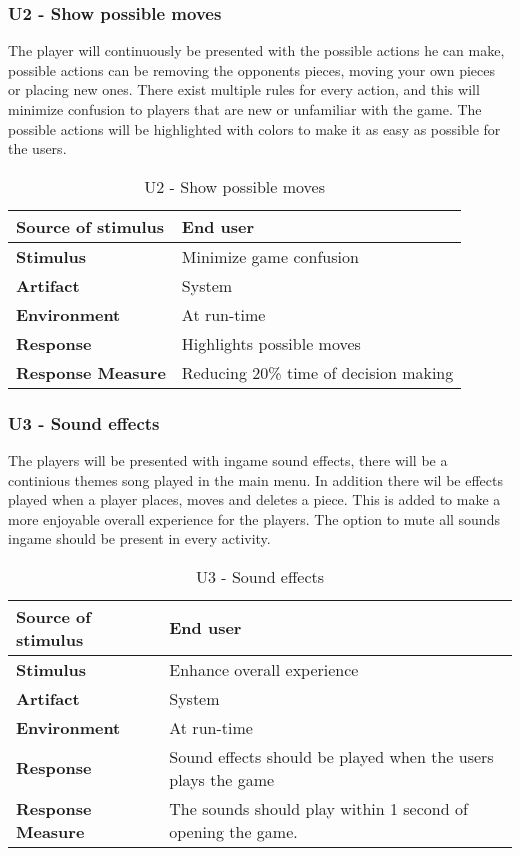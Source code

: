 \pagebreak

\subsubsection{U2 - Show possible moves}

The player will continuously be presented with the possible actions he can make, possible actions can be removing the opponents pieces, moving your own pieces or placing new ones. There exist multiple rules for every action, and this will minimize confusion to players that are new or unfamiliar with the game. The possible actions will be highlighted with colors to make it as easy as possible for the users.

\begin{table}[h!]
\begin{tabular}{ | p{110pt} | p{250pt}  |}
\hline
\bf Source of stimulus &  End user  \\ \hline
\bf Stimulus & Minimize game confusion \\ \hline 
\bf Artifact & System  \\  \hline
\bf Environment & At run-time \\ \hline
\bf Response & Highlights possible moves \\ \hline
\bf Response Measure & Reducing 20\% time of decision making   \\ \hline
\end{tabular}
\caption{U2 - Show possible moves}
\end{table}

\subsubsection{U3 - Sound effects}

The players will be presented with ingame sound effects, there will be a continious themes song played in the main menu. In addition there wil be effects played when a player places, moves and deletes a piece. This is added to make a more enjoyable overall experience for the players. The option to mute all sounds ingame should be present in every activity.

\begin{table}[h!]
\begin{tabular}{ | p{110pt} | p{250pt}  |}
\hline
\bf Source of stimulus &  End user  \\ \hline
\bf Stimulus & Enhance overall experience \\ \hline 
\bf Artifact & System  \\  \hline
\bf Environment & At run-time \\ \hline
\bf Response & Sound effects should be played when the users plays the game \\ \hline
\bf Response Measure &  The sounds should play within 1 second of opening the game. \\ \hline

\end{tabular}
\caption{U3 - Sound effects}
\end{table}

